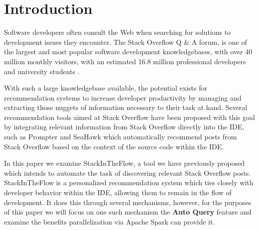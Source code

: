 \documentclass[conference]{IEEEtran}
\newcommand{\so}{Stack Overflow\xspace}
\newcommand{\sitf}{{\sc StackInTheFlow}\xspace}
\begin{document}
\begin{abstract}
The Apache Spark cluster-computing framework has the potential to drastically reduce the runtimes of tasks which are sufficiently parallelizable.  In this paper we present an examination of this capability through the use case of optimizing \sitf, a tool that generates interpretable queries to \so at the developer's behest.  Through our analysis, we observe that we can reduce the runtime of a step of the query generation process in half by leveraging Apache Spark.
\end{abstract}





%
\IEEEpeerreviewmaketitle

\section{Introduction}
Software developers often consult the Web when searching for solutions to development issues they encounter.  The \so Q \& A forum, is one of the largest and most popular software development knowledgebases, with over 40 million monthly visitors, with an estimated 16.8 million professional developers and university students \cite{}.

With such a large knowledgebase available, the potential exists for recommendation systems to increase developer productivity by managing and extracting those nuggets of information necessary to their task at hand.  Several recommendation tools aimed at \so have been proposed with this goal by integrating relevant information from \so directly into the IDE, such as Prompter \cite{} and SeaHawk \cite{} which automatically recommend posts from \so based on the context of the source code within the IDE.

In this paper we examine \sitf, a tool we have previously proposed which intends to automate the task of discovering relevant \so posts. \sitf is a personalized recommendation system which ties closely with developer behavior within the IDE, allowing them to remain in the flow of development.  It does this through several mechanisms, however, for the purposes of this paper we will focus on one such mechanism the \textbf{Auto Query} feature and examine the benefits parallelization via Apache Spark can provide it.
\end{document}
